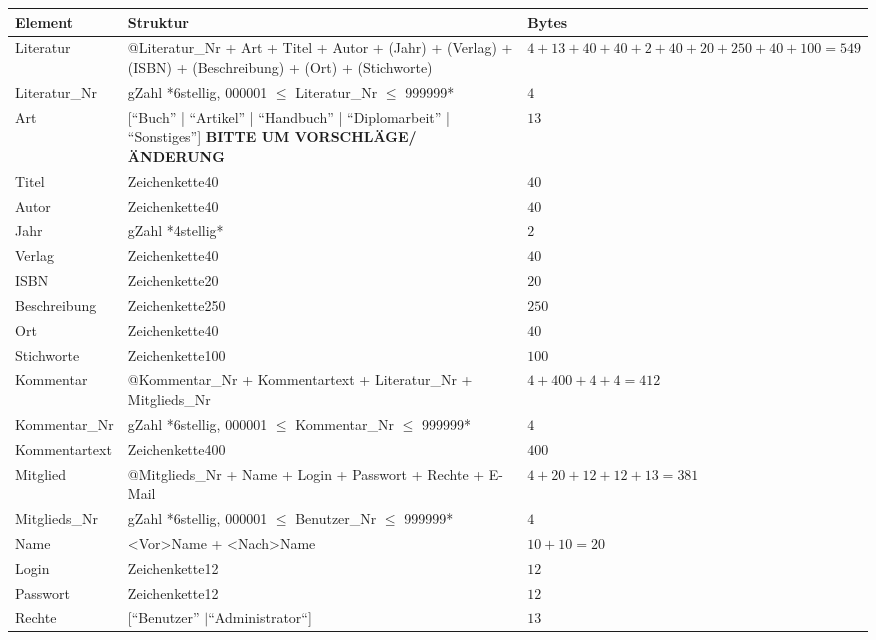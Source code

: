 \begin{longtable}{|l|p{6.0cm}|p{2cm}|}
\hline
Element & Struktur & Bytes\\
\hline\hline

Literatur & @Literatur\_Nr + Art + Titel + Autor + (Jahr) + (Verlag) + (ISBN) + (Beschreibung) + (Ort) + (Stichworte) & $4 + 13 + 40 + 40 + 2 + 40 + 20 + 250 + 40 + 100 = 549$ \\
\hline
Literatur\_Nr & gZahl *6stellig, 000001 $\leq$ Literatur\_Nr $\leq$ 999999*  & $4$\\
\hline
Art & [``Buch'' | ``Artikel'' | ``Handbuch'' | ``Diplomarbeit'' | ``Sonstiges''] \textbf{BITTE UM VORSCHLÄGE/ÄNDERUNG}  & $13$\\
\hline
Titel & Zeichenkette40 & $40$ \\
\hline
Autor & Zeichenkette40 & $40$\\
\hline
Jahr & gZahl *4stellig* & $2$\\
\hline
Verlag & Zeichenkette40 & $40$ \\
\hline
ISBN & Zeichenkette20 & $20$  \\
\hline
Beschreibung & Zeichenkette250 & $250$ \\
\hline
Ort & Zeichenkette40 & $40$ \\
\hline
Stichworte & Zeichenkette100 & $100$\\
\hline\hline

Kommentar & @Kommentar\_Nr + Kommentartext + Literatur\_Nr + Mitglieds\_Nr & $4 + 400 + 4 + 4 = 412 $\\
\hline
Kommentar\_Nr & gZahl *6stellig, 000001 $\leq$ Kommentar\_Nr $\leq$ 999999* & $4$ \\
\hline
Kommentartext & Zeichenkette400 & $400$\\
\hline\hline

Mitglied  & @Mitglieds\_Nr  + Name + Login + Passwort + Rechte + E-Mail & $4 + 20 + 12 + 12 + 13 = 381 $\\
\hline
Mitglieds\_Nr & gZahl *6stellig, 000001 $\leq$ Benutzer\_Nr $\leq$ 999999* & $4$ \\ 
\hline
Name & <Vor>Name + <Nach>Name & $10 + 10 = 20$\\
\hline
Login & Zeichenkette12 & $12$\\
\hline
Passwort & Zeichenkette12 & $12$\\
\hline
Rechte & [``Benutzer'' $\mid $``Administrator``] & $13$ \\
\hline\hline


\end{longtable}
